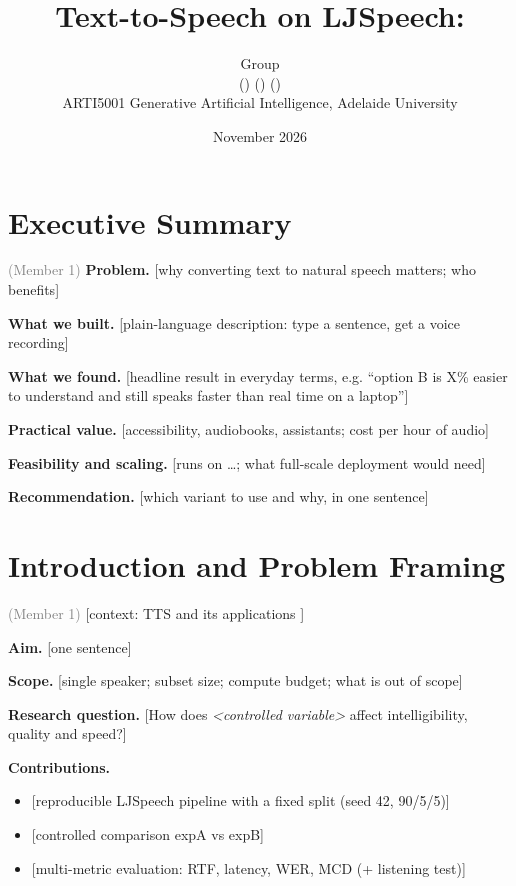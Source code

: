\documentclass[11pt,a4paper]{article}
\title{\textbf{Text-to-Speech on LJSpeech:\\ \ph{subtitle stating the controlled comparison}}}
\author{Group \ph{NN}\\[4pt]
\ph{Name 1} (\ph{a1xxxxxxx}) \quad \ph{Name 2} (\ph{a1xxxxxxx}) \quad \ph{Name 3} (\ph{a1xxxxxxx})\\[4pt]
ARTI5001 Generative Artificial Intelligence, Adelaide University}
\date{\ph{DD} November 2026}
\newcommand{\ph}[1]{\colorbox{red!12}{\textcolor{red!70!black}{\small\textsf{[#1]}}}}
\newcommand{\owner}[1]{\hfill{\small\textcolor{gray}{(#1)}}}
\begin{document}
\maketitle
\thispagestyle{empty}

\section*{Executive Summary}\owner{Member 1}
\noindent\textbf{Problem.} \ph{why converting text to natural speech matters; who benefits}

\noindent\textbf{What we built.} \ph{plain-language description: type a sentence, get a voice recording}

\noindent\textbf{What we found.} \ph{headline result in everyday terms, e.g. ``option B is X\% easier to understand and still speaks faster than real time on a laptop''}

\noindent\textbf{Practical value.} \ph{accessibility, audiobooks, assistants; cost per hour of audio}

\noindent\textbf{Feasibility and scaling.} \ph{runs on \ldots; what full-scale deployment would need}

\noindent\textbf{Recommendation.} \ph{which variant to use and why, in one sentence}
\newpage

\section{Introduction and Problem Framing}\owner{Member 1}
\ph{context: TTS and its applications \citep{shen2018tacotron2}}

\noindent\textbf{Aim.} \ph{one sentence}

\noindent\textbf{Scope.} \ph{single speaker; subset size; compute budget; what is out of scope}

\noindent\textbf{Research question.} \ph{How does \emph{<controlled variable>} affect intelligibility, quality and speed?}

\noindent\textbf{Contributions.}
\begin{itemize}
  \item \ph{reproducible LJSpeech pipeline with a fixed split (seed 42, 90/5/5)}
  \item \ph{controlled comparison expA vs expB}
  \item \ph{multi-metric evaluation: RTF, latency, WER, MCD (+ listening test)}
\end{itemize}
\end{document}
